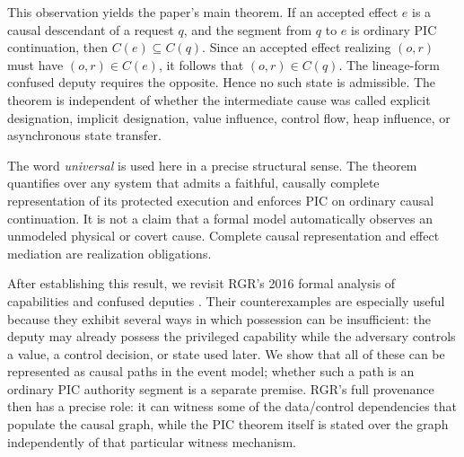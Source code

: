 \documentclass[10pt,twocolumn]{article}
\begin{document}
This observation yields the paper's main theorem.  If an accepted effect $e$
is a causal descendant of a request $q$, and the segment from $q$ to $e$ is
ordinary PIC continuation, then $C(e)\subseteq C(q)$.  Since an accepted effect
realizing $(o,r)$ must have $(o,r)\in C(e)$, it follows that $(o,r)\in C(q)$.
The lineage-form confused deputy requires the opposite.  Hence no such state is
admissible.  The theorem is independent of whether the intermediate cause was
called explicit designation, implicit designation, value influence, control
flow, heap influence, or asynchronous state transfer.

The word \emph{universal} is used here in a precise structural sense.  The
theorem quantifies over any system that admits a faithful, causally complete
representation of its protected execution and enforces PIC on ordinary causal
continuation.  It is not a claim that a formal model automatically observes an
unmodeled physical or covert cause.  Complete causal representation and effect
mediation are realization obligations.

After establishing this result, we revisit RGR's 2016 formal analysis of
capabilities and confused deputies \cite{rajani_garg_rezk2016}.  Their
counterexamples are especially useful because they exhibit several ways in
which possession can be insufficient: the deputy may already possess the
privileged capability while the adversary controls a value, a control decision,
or state used later.  We show that all of these can be represented as causal
paths in the event model; whether such a path is an ordinary PIC authority
segment is a separate premise.  RGR's full provenance then has a precise role: it can witness
some of the data/control dependencies that populate the causal graph, while the
PIC theorem itself is stated over the graph independently of that particular
witness mechanism.
\end{document}
